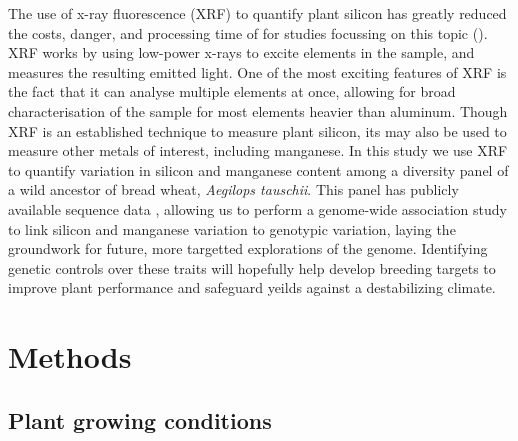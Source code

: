 \documentclass[12pt, letterpaper, ]{report}
\begin{document}
The use of x-ray fluorescence (XRF) to quantify plant silicon has greatly reduced the costs, danger, and processing time of for studies focussing on this topic (\cite{reidinger_rapid_2012}). XRF works by using low-power x-rays to excite elements in the sample, and measures the resulting emitted light. One of the most exciting features of XRF is the fact that it can analyse multiple elements at once, allowing for broad characterisation of the sample for most elements heavier than aluminum. Though XRF is an established technique to measure plant silicon, its may also be used to measure other metals of interest, including manganese. In this study we use XRF to quantify variation in silicon and manganese content among a diversity panel of a wild ancestor of bread wheat, \textit{Aegilops tauschii}. This panel has publicly available sequence data \cite{gaurav_population_2022}, allowing us to perform a genome-wide association study to link silicon and manganese variation to genotypic variation, laying the groundwork for future, more targetted explorations of the genome. Identifying genetic controls over these traits will hopefully help develop breeding targets to improve plant performance and safeguard yeilds against a destabilizing climate.

\section{Methods}

\subsection{Plant growing conditions}
\end{document}
